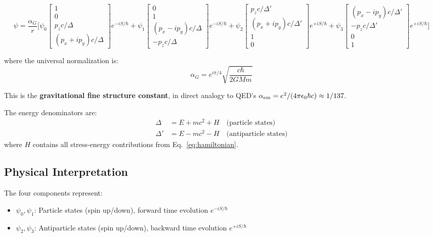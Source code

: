 \documentclass[11pt,a4paper]{article}
\theoremstyle{definition}
\theoremstyle{remark}
\begin{document}
	\begin{equation}
		\psi = \frac{\alpha_G}{r}\Bigg[
		\psi_0\begin{bmatrix}1\\0\\ p_zc/\Delta\\ (p_x+ip_y)c/\Delta\end{bmatrix}e^{-iS/\hbar}
		+\psi_1\begin{bmatrix}0\\1\\ (p_x-ip_y)c/\Delta\\ -p_zc/\Delta\end{bmatrix}e^{-iS/\hbar}
		+\psi_2\begin{bmatrix}p_zc/\Delta'\\ (p_x+ip_y)c/\Delta'\\1\\0\end{bmatrix}e^{+iS/\hbar}
		+\psi_3\begin{bmatrix}(p_x-ip_y)c/\Delta'\\ -p_zc/\Delta'\\0\\1\end{bmatrix}e^{+iS/\hbar}
		\Bigg]
		\label{eq:four_component_wavefunction}
	\end{equation}
	
	where the universal normalization is:
	\begin{equation}
		\boxed{\alpha_G = e^{i\pi/4}\sqrt{\frac{c\hbar}{2GMm}}}
		\label{eq:universal_alphaG}
	\end{equation}
	
	This is the \textbf{gravitational fine structure constant}, in direct analogy to QED's $\alpha_{\rm em}=e^2/(4\pi\epsilon_0\hbar c)\approx 1/137$.
	
	The energy denominators are:
	\begin{align}
		\Delta  &= E + mc^2 + H \quad\text{(particle states)} \\
		\Delta' &= E - mc^2 - H \quad\text{(antiparticle states)}
	\end{align}
	where $H$ contains all stress-energy contributions from Eq.~\eqref{eq:hamiltonian}.
	
	\subsection{Physical Interpretation}
	
	The four components represent:
	\begin{itemize}
		\item $\psi_0,\psi_1$: Particle states (spin up/down), forward time evolution $e^{-iS/\hbar}$
		\item $\psi_2,\psi_3$: Antiparticle states (spin up/down), backward time evolution $e^{+iS/\hbar}$
	\end{itemize}
	
\end{document}

